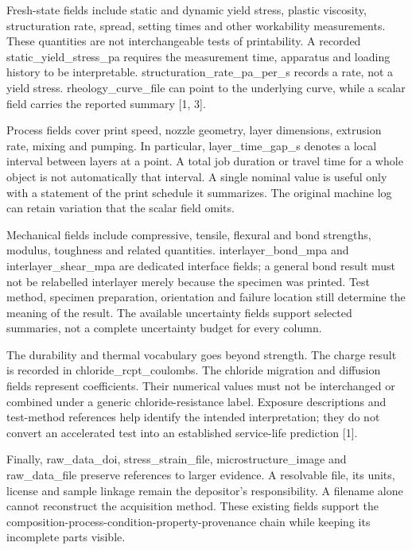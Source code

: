 \documentclass[
  american,
  11pt,
  letterpaper,
]{article}
\renewcommand{\texttt}[1]{{\ttfamily\fontsize{9.5}{11}\selectfont\hyphenchar\font=-1 #1}}
\begin{document}
Fresh-state fields include static and dynamic yield stress, plastic
viscosity, structuration rate, spread, setting times and other
workability measurements. These quantities are not interchangeable tests
of printability. A recorded \texttt{static\_yield\_stress\_pa} requires
the measurement time, apparatus and loading history to be interpretable.
\texttt{structuration\_rate\_pa\_per\_s} records a rate, not a yield
stress. \texttt{rheology\_curve\_file} can point to the underlying
curve, while a scalar field carries the reported summary {[}1, 3{]}.

Process fields cover print speed, nozzle geometry, layer dimensions,
extrusion rate, mixing and pumping. In particular,
\texttt{layer\_time\_gap\_s} denotes a local interval between layers at
a point. A total job duration or travel time for a whole object is not
automatically that interval. A single nominal value is useful only with
a statement of the print schedule it summarizes. The original machine
log can retain variation that the scalar field omits.

Mechanical fields include compressive, tensile, flexural and bond
strengths, modulus, toughness and related quantities.
\texttt{interlayer\_bond\_mpa} and \texttt{interlayer\_shear\_mpa} are
dedicated interface fields; a general bond result must not be relabelled
interlayer merely because the specimen was printed. Test method,
specimen preparation, orientation and failure location still determine
the meaning of the result. The available uncertainty fields support
selected summaries, not a complete uncertainty budget for every column.

The durability and thermal vocabulary goes beyond strength. The charge
result is recorded in \texttt{chloride\_rcpt\_coulombs}. The chloride
migration and diffusion fields represent coefficients. Their numerical
values must not be interchanged or combined under a generic
chloride-resistance label. Exposure descriptions and test-method
references help identify the intended interpretation; they do not
convert an accelerated test into an established service-life prediction
{[}1{]}.

Finally, \texttt{raw\_data\_doi}, \texttt{stress\_strain\_file},
\texttt{microstructure\_image} and \texttt{raw\_data\_file} preserve
references to larger evidence. A resolvable file, its units, license and
sample linkage remain the depositor's responsibility. A filename alone
cannot reconstruct the acquisition method. These existing fields support
the composition-process-condition-property-provenance chain while
keeping its incomplete parts visible.
\end{document}
